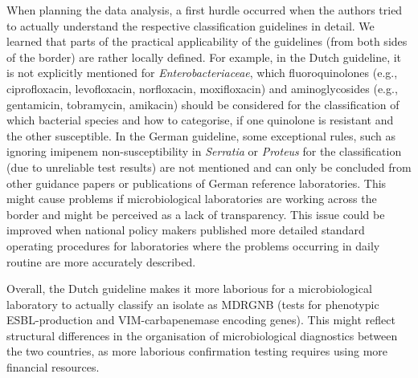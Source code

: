\documentclass[
]{book}
\begin{document}
When planning the data analysis, a first hurdle occurred when the authors tried to actually understand the respective classification guidelines in detail. We learned that parts of the practical applicability of the guidelines (from both sides of the border) are rather locally defined. For example, in the Dutch guideline, it is not explicitly mentioned for \emph{Enterobacteriaceae}, which fluoroquinolones (e.g., ciprofloxacin, levofloxacin, norfloxacin, moxifloxacin) and aminoglycosides (e.g., gentamicin, tobramycin, amikacin) should be considered for the classification of which bacterial species and how to categorise, if one quinolone is resistant and the other susceptible. In the German guideline, some exceptional rules, such as ignoring imipenem non-susceptibility in \emph{Serratia} or \emph{Proteus} for the classification (due to unreliable test results) are not mentioned and can only be concluded from other guidance papers or publications of German reference laboratories. This might cause problems if microbiological laboratories are working across the border and might be perceived as a lack of transparency. This issue could be improved when national policy makers published more detailed standard operating procedures for laboratories where the problems occurring in daily routine are more accurately described.

Overall, the Dutch guideline makes it more laborious for a microbiological laboratory to actually classify an isolate as MDRGNB (tests for phenotypic ESBL-production and VIM-carbapenemase encoding genes). This might reflect structural differences in the organisation of microbiological diagnostics between the two countries, as more laborious confirmation testing requires using more financial resources.
\end{document}
